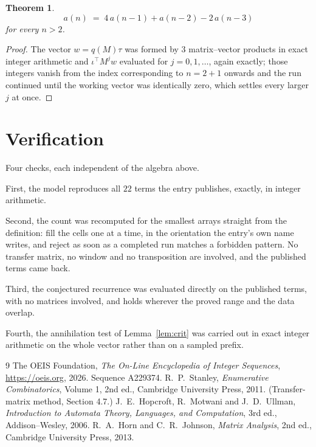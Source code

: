 \documentclass[11pt,a4paper]{article}
\theoremstyle{plain}
\newtheorem{theorem}{Theorem}
\theoremstyle{definition}
\begin{document}
\begin{theorem}
\[
a(n)\;=\;4\,a(n-1) + a(n-2) - 2\,a(n-3)
\]
for every $n>2$.
\end{theorem}

\begin{proof}
The vector $w=q(M)\tau$ was formed by $3$ matrix--vector products in exact integer
arithmetic and $\iota^{\!\top}M^{j}w$ evaluated for $j=0,1,\dots$, again exactly; those
integers vanish from the index corresponding to $n=2+1$ onwards and the run continued
until the working vector was identically zero, which settles every larger $j$ at once.
\end{proof}

\section{Verification}

Four checks, each independent of the algebra above.

First, the model reproduces all $22$ terms the entry publishes, exactly, in integer
arithmetic.

Second, the count was recomputed for the smallest arrays straight from the definition: fill the
cells one at a time, in the orientation the entry's own name writes, and reject as soon as a
completed run matches a forbidden pattern. No transfer matrix, no window and no transposition
are involved, and the published terms came back.

Third, the conjectured recurrence was evaluated directly on the published terms, with no
matrices involved, and holds wherever the proved range and the data overlap.

Fourth, the annihilation test of Lemma~\ref{lem:crit} was carried out in exact integer
arithmetic on the whole vector rather than on a sampled prefix.

\begin{thebibliography}{9}
 The OEIS Foundation, \emph{The On-Line Encyclopedia of Integer
Sequences}, \url{https://oeis.org}, 2026. Sequence A229374.
 R.~P.~Stanley, \emph{Enumerative Combinatorics}, Volume 1, 2nd ed.,
Cambridge University Press, 2011. (Transfer-matrix method, Section 4.7.)
 J.~E.~Hopcroft, R.~Motwani and J.~D.~Ullman, \emph{Introduction to Automata
Theory, Languages, and Computation}, 3rd ed., Addison--Wesley, 2006.
 R.~A.~Horn and C.~R.~Johnson, \emph{Matrix Analysis}, 2nd ed., Cambridge
University Press, 2013.
\end{thebibliography}
\end{document}
